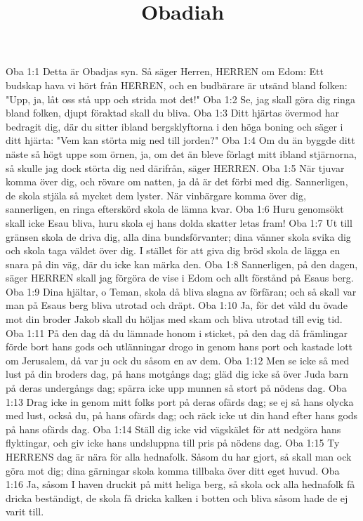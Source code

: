 

\title{Obadiah}

Oba 1:1  Detta är Obadjas syn. Så säger Herren, HERREN om Edom: Ett budskap hava vi hört från HERREN, och en budbärare är utsänd bland folken: "Upp, ja, låt oss stå upp och strida mot det!"
Oba 1:2  Se, jag skall göra dig ringa bland folken, djupt föraktad skall du bliva.
Oba 1:3  Ditt hjärtas övermod har bedragit dig, där du sitter ibland bergsklyftorna i den höga boning och säger i ditt hjärta: "Vem kan störta mig ned till jorden?"
Oba 1:4  Om du än byggde ditt näste så högt uppe som örnen, ja, om det än bleve förlagt mitt ibland stjärnorna, så skulle jag dock störta dig ned därifrån, säger HERREN.
Oba 1:5  När tjuvar komma över dig, och rövare om natten, ja då är det förbi med dig. Sannerligen, de skola stjäla så mycket dem lyster. När vinbärgare komma över dig, sannerligen, en ringa efterskörd skola de lämna kvar.
Oba 1:6  Huru genomsökt skall icke Esau bliva, huru skola ej hans dolda skatter letas fram!
Oba 1:7  Ut till gränsen skola de driva dig, alla dina bundsförvanter; dina vänner skola svika dig och skola taga väldet över dig. I stället för att giva dig bröd skola de lägga en snara på din väg, där du icke kan märka den.
Oba 1:8  Sannerligen, på den dagen, säger HERREN skall jag förgöra de vise i Edom och allt förstånd på Esaus berg.
Oba 1:9  Dina hjältar, o Teman, skola då bliva slagna av förfäran; och så skall var man på Esaus berg bliva utrotad och dräpt.
Oba 1:10  Ja, för det våld du övade mot din broder Jakob skall du höljas med skam och bliva utrotad till evig tid.
Oba 1:11  På den dag då du lämnade honom i sticket, på den dag då främlingar förde bort hans gods och utlänningar drogo in genom hans port och kastade lott om Jerusalem, då var ju ock du såsom en av dem.
Oba 1:12  Men se icke så med lust på din broders dag, på hans motgångs dag; gläd dig icke så över Juda barn på deras undergångs dag; spärra icke upp munnen så stort på nödens dag.
Oba 1:13  Drag icke in genom mitt folks port på deras ofärds dag; se ej så hans olycka med lust, också du, på hans ofärds dag; och räck icke ut din hand efter hans gods på hans ofärds dag.
Oba 1:14  Ställ dig icke vid vägskälet för att nedgöra hans flyktingar, och giv icke hans undsluppna till pris på nödens dag.
Oba 1:15  Ty HERRENS dag är nära för alla hednafolk. Såsom du har gjort, så skall man ock göra mot dig; dina gärningar skola komma tillbaka över ditt eget huvud.
Oba 1:16  Ja, såsom I haven druckit på mitt heliga berg, så skola ock alla hednafolk få dricka beständigt, de skola få dricka kalken i botten och bliva såsom hade de ej varit till.

